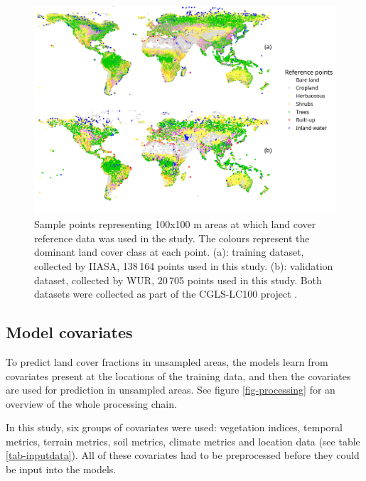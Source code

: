 \documentclass[review,authoryear,3p]{elsarticle}
\begin{document}
\begin{figure}
 \includegraphics[width=\textwidth]{article/article-figures/maps/2020-07-06-training-and-validation}
 \caption{Sample points representing 100x100 m areas at which land cover reference data was used in the study. The colours represent the dominant land cover class at each point. (a): training dataset, collected by \gls{IIASA}, 138\,164 points used in this study. (b): validation dataset, collected by \gls{WUR}, 20\,705 points used in this study. Both datasets were collected as part of the \ac{CGLS-LC100} project \citep{buchhorn_copernicus_2020}.}
 \label{fig-reference-data}
\end{figure}

\subsection{Model covariates}

To predict land cover fractions in unsampled areas, the models learn from covariates present at the locations of the training data, and then the covariates are used for prediction in unsampled areas.
See figure \ref{fig-processing} for an overview of the whole processing chain.

In this study, six groups of covariates were used: vegetation indices, temporal metrics, terrain metrics, soil metrics, climate metrics and location data (see table \ref{tab-inputdata}).
All of these covariates had to be preprocessed before they could be input into the models.
\end{document}

